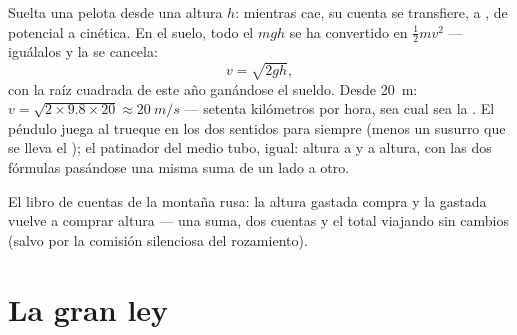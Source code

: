 \begin{example}\label{ex:g9:energy-conversions:trade}
Suelta una pelota desde una altura $h$: mientras cae, su cuenta se
transfiere,  a , de potencial a cinética. En
el suelo, todo el $m g h$ se ha convertido en $\frac12 m v^2$ ---
iguálalos y la  se cancela:
\[
v = \sqrt{2 g h},
\]
con la raíz cuadrada de este año ganándose el sueldo. Desde
\qty{20}{m}: $v = \sqrt{2 \times 9.8 \times 20} \approx \qty{20}{m/s}$
--- setenta kilómetros por hora, sea cual sea la . El péndulo
juega al trueque en los dos sentidos para siempre (menos un susurro que
se lleva el ); el patinador del medio tubo, igual: altura a
 y a altura, con las dos fórmulas pasándose una misma suma
de un lado a otro.
\end{example}

\begin{omfigure}

{\small El libro de cuentas de la montaña rusa: la altura gastada
compra  y la  gastada vuelve a
comprar altura --- una suma, dos cuentas y el total viajando sin cambios
(salvo por la comisión silenciosa del rozamiento).}
\end{omfigure}

\section{La gran ley}

